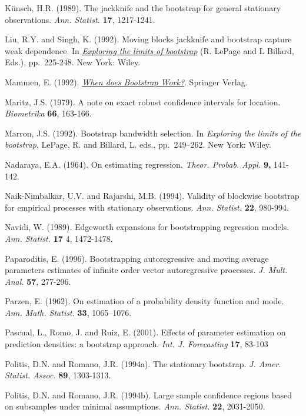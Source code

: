 \documentclass[
]{book}
\theoremstyle{definition}
\theoremstyle{definition}
\theoremstyle{definition}
\theoremstyle{remark}
\begin{document}
Künsch, H.R. (1989). The jackknife and the bootstrap for general
stationary observations. \emph{Ann. Statist.} \textbf{17}, 1217-1241.

Liu, R.Y. and Singh, K. (1992). Moving blocks jackknife and bootstrap
capture weak dependence. In \href{https://books.google.es/books?hl=es\&lr=\&id=ZJzIpNZNVLgC\&oi=fnd\&pg=PA3\&dq=Exploring+the+limits+of+the+bootstrap}{\emph{Exploring the limits of bootstrap}}
(R. LePage and L Billard, Eds.), pp.~225-248. New York: Wiley.

Mammen, E. (1992). \href{https://books.google.es/books?hl=es\&lr=\&id=zpDfBwAAQBAJ\&oi=fnd\&pg=PP8\&dq=When+does+Bootstrap+Work\%3F}{\emph{When does Bootstrap Work?}}.
Springer Verlag.

Maritz, J.S. (1979). A note on exact robust confidence intervals for
location. \emph{Biometrika} \textbf{66}, 163-166.

Marron, J.S. (1992). Bootstrap bandwidth selection. In
\emph{Exploring the limits of the bootstrap}, LePage, R. and Billard,
L. eds., pp.~249--262. New York: Wiley.

Nadaraya, E.A. (1964). On estimating regression. \emph{Theor. Probab. Appl.}
\textbf{9,} 141-142.

Naik-Nimbalkar, U.V. and Rajarshi, M.B. (1994). Validity of blockwise
bootstrap for empirical processes with stationary observations.
\emph{Ann. Statist.} \textbf{22}, 980-994.

Navidi, W. (1989). Edgeworth expansions for bootstrapping regression
models. \emph{Ann. Statist.} \textbf{17} 4, 1472-1478.

Paparoditis, E. (1996). Bootstrapping autoregressive and moving average
parameters estimates of infinite order vector autoregressive processes.
\emph{J. Mult. Anal.} \textbf{57}, 277-296.

Parzen, E. (1962). On estimation of a probability density function and
mode. \emph{Ann. Math. Statist.} \textbf{33}, 1065--1076.

Pascual, L., Romo, J. and Ruiz, E. (2001). Effects of parameter
estimation on prediction densities: a bootstrap approach.
\emph{Int. J. Forecasting} \textbf{17}, 83-103

Politis, D.N. and Romano, J.R. (1994a). The stationary bootstrap.
\emph{J. Amer. Statist. Assoc.} \textbf{89}, 1303-1313.

Politis, D.N. and Romano, J.R. (1994b). Large sample confidence regions
based on subsamples under minimal assumptions. \emph{Ann. Statist.} \textbf{22},
2031-2050.
\end{document}
